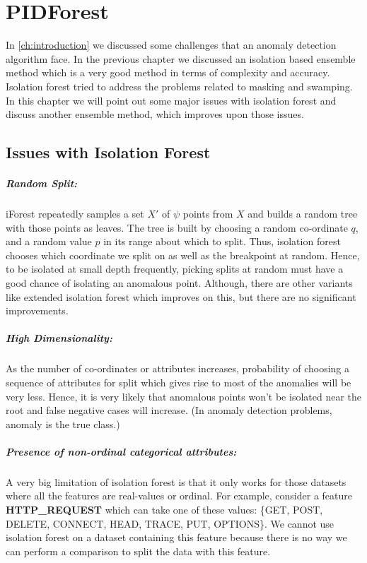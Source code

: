 \chapter{PIDForest}
\label{ch:pidforest}

In \cref{ch:introduction} we discussed some challenges that an anomaly detection algorithm face.
In the previous chapter we discussed an isolation based ensemble method which is a very good method in terms of complexity and accuracy.
Isolation forest tried to address the problems related to masking and swamping.
In this chapter we will point out some major issues with isolation forest and discuss another ensemble method, which improves upon those issues.

\section{Issues with Isolation Forest}
\label{sec:issues-with-iforest}

\paragraph{Random Split:} iForest repeatedly samples a set $X'$ of $\psi$ points from $X$ and builds a random tree with those points as leaves. 
The tree is built by choosing a random co-ordinate $q$, and a random value $p$ in its range about which to split. 
Thus, isolation forest chooses which coordinate we split on as well as the breakpoint at random.
Hence, to be isolated at small depth frequently, picking splits at random must have a good chance of isolating an anomalous point.
Although, there are other variants like extended isolation forest which improves on this, but there are no significant improvements.

\paragraph{High Dimensionality:} As the number of co-ordinates or attributes increases, probability of choosing a sequence of attributes for split which gives rise to most of the anomalies will be very less. 
Hence, it is very likely that anomalous points won't be isolated near the root and false negative cases will increase. (In anomaly detection problems, anomaly is the true class.)

\paragraph{Presence of non-ordinal categorical attributes:} A very big limitation of isolation forest is that it only works for those datasets where all the features are real-values or ordinal. For example, consider a feature \textbf{HTTP\_REQUEST} which can take one of these values: \{GET, POST, DELETE, CONNECT, HEAD, TRACE, PUT, OPTIONS\}. We cannot use isolation forest on a dataset containing this feature because there is no way we can perform a comparison to split the data with this feature.

